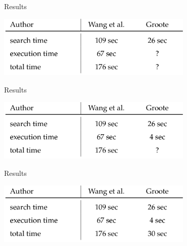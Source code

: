 \begin{frame}[fragile]{Results} 
\begin{center}
 \includegraphics[width=0.7\textwidth]{figures/results/wang_groote_2}
\end{center}
\end{frame}
\begin{frame}[fragile]{Results} 
\begin{center}
 \includegraphics[width=0.7\textwidth]{figures/results/wang_groote_3}
\end{center}
\end{frame}
\begin{frame}[fragile]{Results} 
\begin{center}
 \includegraphics[width=0.7\textwidth]{figures/results/wang_groote_4}
\end{center}
\end{frame}





